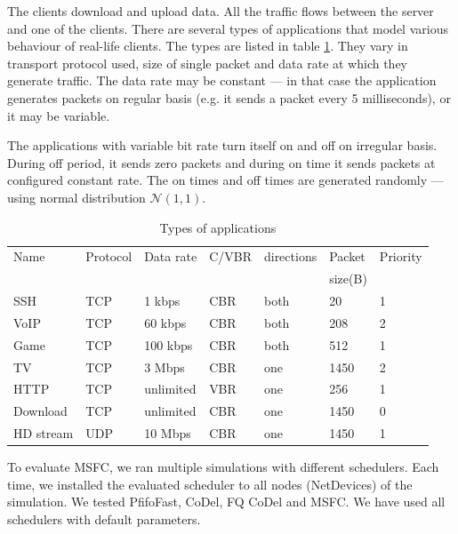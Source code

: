 The clients download and upload data. All the traffic flows between the server and one of the clients. There are several types of applications that model various behaviour of real-life clients. The types are listed in table \ref{tab01:traffic}. They vary in transport protocol used, size of single packet and data rate at which they generate traffic. The data rate may be constant --- in that case the application generates packets on regular basis (e.g. it sends a packet every 5 milliseconds), or it may be variable.

The applications with variable bit rate turn itself on and off on irregular basis. During off period, it sends zero packets and during on time it sends packets at configured constant rate. The on times and off times are generated randomly --- using normal distribution $\mathcal{N}(1,1)$.

\begin{table}
	\caption{Types of applications}
	\label{tab01:traffic}
	\centering
	
	
	\begin{tabular}{@{}lllllll@{}}
		\toprule
		Name     & Protocol & Data rate & C/VBR   & directions & Packet         & Priority \\ 
		&          &           &         &            & size(B)        & \\ \midrule
		SSH      & TCP      & 1 kbps    & CBR     & both       & 20             & 1        \\
		VoIP     & TCP      & 60 kbps   & CBR     & both       & 208            & 2        \\
		Game     & TCP      & 100 kbps  & CBR     & both       & 512            & 1        \\
		TV       & TCP      & 3 Mbps    & CBR     & one        & 1450           & 2        \\
		HTTP     & TCP      & unlimited & VBR     & one        & 256            & 1        \\
		Download & TCP      & unlimited & CBR     & one        & 1450           & 0        \\
		HD stream& UDP      & 10 Mbps   & CBR     & one        & 1450           & 1        \\ \bottomrule
	\end{tabular}
\end{table}



To evaluate MSFC, we ran multiple simulations with different schedulers. Each time, we installed the evaluated scheduler to all nodes (NetDevices) of the simulation. We tested PfifoFast, CoDel, FQ CoDel and MSFC. We have used all schedulers with default parameters. 

